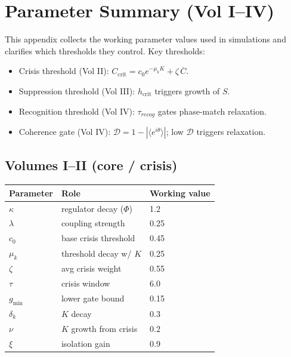 ﻿\section*{Parameter Summary (Vol I--IV)}
This appendix collects the working parameter values used in simulations and clarifies which thresholds they control.
Key thresholds:
\begin{itemize}
    \item Crisis threshold (Vol II): $C_{\mathrm{crit}} = c_0 e^{-\mu_k K} + \zeta\,\overline{C}$.
    \item Suppression threshold (Vol III): $h_{\mathrm{crit}}$ triggers growth of $S$.
    \item Recognition threshold (Vol IV): $\tau_{recog}$ gates phase-match relaxation.
    \item Coherence gate (Vol IV): $\mathcal{D}=1-|\langle e^{i\theta}\rangle|$; low $\mathcal{D}$ triggers relaxation.
\end{itemize}

\subsection*{Volumes I--II (core / crisis)}
\begin{tabular}{lll}
\toprule
Parameter & Role & Working value \\
\midrule
$\kappa$ & regulator decay ($\Phi$) & 1.2 \\
$\lambda$ & coupling strength & 0.25 \\
$c_0$ & base crisis threshold & 0.45 \\
$\mu_k$ & threshold decay w/ $K$ & 0.25 \\
$\zeta$ & avg crisis weight & 0.55 \\
$\tau$ & crisis window & 6.0 \\
$g_{\min}$ & lower gate bound & 0.15 \\
$\delta_k$ & $K$ decay & 0.3 \\
$\nu$ & $K$ growth from crisis & 0.2 \\
$\xi$ & isolation gain & 0.9 \\
\bottomrule
\end{tabular}

